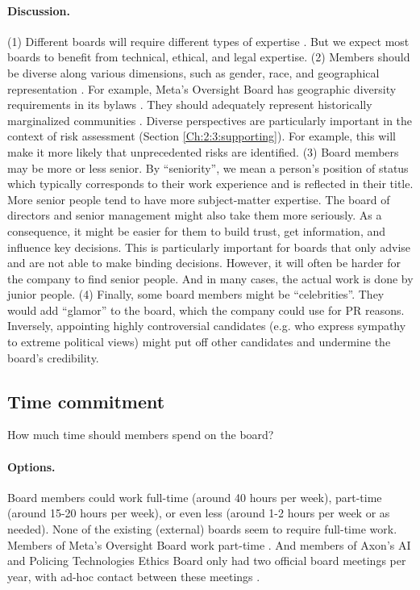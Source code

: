 \documentclass{article}
\begin{document}
\paragraph{Discussion.} (1) Different boards will require different types of expertise \cite{sandler2019building}. But we expect most boards to benefit from technical, ethical, and legal expertise. (2) Members should be diverse along various dimensions, such as gender, race, and geographical representation \cite{gupta2020ai}. For example, Meta’s Oversight Board has geographic diversity requirements in its bylaws \cite{oversight2022bylaws}. They should adequately represent historically marginalized communities \cite{mohamed2020decolonial, birhane2022power}. Diverse perspectives are particularly important in the context of risk assessment (Section \ref{Ch:2:3:supporting}). For example, this will make it more likely that unprecedented risks are identified. (3) Board members may be more or less senior. By “seniority”, we mean a person’s position of status which typically corresponds to their work experience and is reflected in their title. More senior people tend to have more subject-matter expertise. The board of directors and senior management might also take them more seriously. As a consequence, it might be easier for them to build trust, get information, and influence key decisions. This is particularly important for boards that only advise and are not able to make binding decisions. However, it will often be harder for the company to find senior people. And in many cases, the actual work is done by junior people. (4) Finally, some board members might be “celebrities”. They would add “glamor” to the board, which the company could use for PR reasons. Inversely, appointing highly controversial candidates (e.g. who express sympathy to extreme political views) might put off other candidates and undermine the board’s credibility.

\subsection{Time commitment}\label{Ch:4:5:time}

How much time should members spend on the board?

\paragraph{Options.} Board members could work full-time (around 40 hours per week), part-time (around 15-20 hours per week), or even less (around 1-2 hours per week or as needed). None of the existing (external) boards seem to require full-time work. Members of Meta’s Oversight Board work part-time \cite{klonick2021insights}. And members of Axon’s AI and Policing Technologies Ethics Board only had two official board meetings per year, with ad-hoc contact between these meetings \cite{axon2019policing}.
\end{document}
